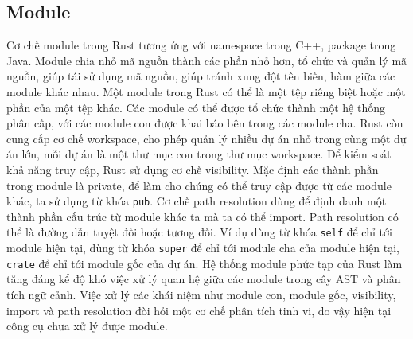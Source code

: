 \subsection{Module}

Cơ chế module trong Rust tương ứng với namespace trong C++, package trong Java.
Module chia nhỏ mã nguồn thành các phần nhỏ hơn, tổ chức và quản lý mã nguồn, giúp tái sử dụng mã nguồn, giúp tránh xung đột tên biến, hàm giữa các module khác nhau.
Một module trong Rust có thể là một tệp riêng biệt hoặc một phần của một tệp khác.
Các module có thể được tổ chức thành một hệ thống phân cấp, với các module con được khai báo bên trong các module cha.
Rust còn cung cấp cơ chế workspace, cho phép quản lý nhiều dự án nhỏ trong cùng một dự án lớn, mỗi dự án là một thư mục con trong thư mục workspace.
Để kiểm soát khả năng truy cập, Rust sử dụng cơ chế visibility.
Mặc định các thành phần trong module là private, để làm cho chúng có thể truy cập được từ các module khác, ta sử dụng từ khóa \texttt{pub}.
Cơ chế path resolution dùng để định danh một thành phần cấu trúc từ module khác ta mà ta có thể import.
Path resolution có thể là đường dẫn tuyệt đối hoặc tương đối.
Ví dụ dùng từ khóa \texttt{self} để chỉ tới module hiện tại, dùng từ khóa \texttt{super} để chỉ tới module cha của module hiện tại, \texttt{crate} để chỉ tới module gốc của dự án.
Hệ thống module phức tạp của Rust làm tăng đáng kể độ khó việc xử lý quan hệ giữa các module trong cây AST và phân tích ngữ cảnh.
Việc xử lý các khái niệm như module con, module gốc, visibility, import và path resolution đòi hỏi một cơ chế phân tích tinh vi, do vậy hiện tại công cụ chưa xử lý được module.



